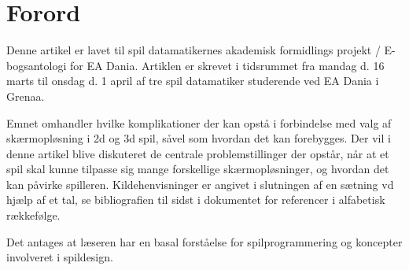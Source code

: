 
\chapter*{Forord}
Denne artikel er lavet til spil datamatikernes akademisk formidlings projekt / E-bogsantologi for EA Dania. Artiklen er skrevet i tidsrummet fra mandag d. 16 marts til onsdag d. 1 april af tre spil datamatiker studerende ved EA Dania i Grenaa.

Emnet omhandler hvilke komplikationer der kan opstå i forbindelse med valg af skærmopløsning i 2d og 3d spil, såvel som hvordan det kan forebygges. Der vil i denne artikel blive diskuteret de centrale problemstillinger der opstår, når at et spil skal kunne tilpasse sig mange forskellige skærmopløsninger, og hvordan det kan påvirke spilleren. Kildehenvisninger er angivet i slutningen af en sætning vd hjælp af et tal, se bibliografien til sidst i dokumentet for referencer i alfabetisk rækkefølge.

Det antages at læseren har en basal forståelse for spilprogrammering og koncepter involveret i spildesign.


	\newpage
		\pagestyle{fancy}
		\lhead{} \chead{} \rhead{} \lfoot{} \cfoot{} \rfoot{} 	
	
	\tableofcontents
	
	
	\newpage	
	\pagestyle{fancy}
		\lhead{}
		\renewcommand{\headrulewidth}{0.4pt}
		\renewcommand{\footrulewidth}{0.4pt}
	
	\setcounter{page}{1}	
		
		
		
		\clearpage	
		
		

		\clearpage	
	
		
		
		\clearpage		
			
		
		
		\clearpage
		
	\printbibliography


